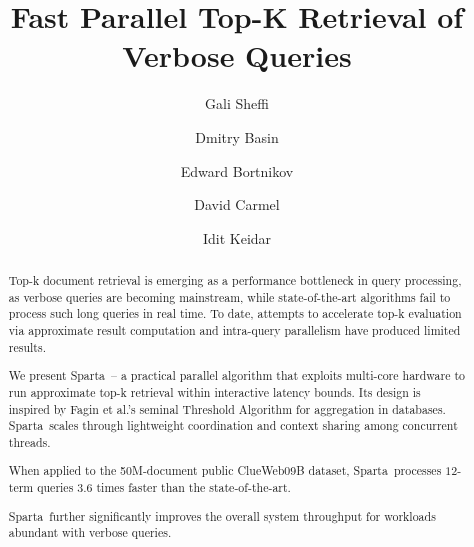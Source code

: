\documentclass[sigconf,review,anonymous]{acmart}
\title{Fast Parallel Top-K Retrieval of Verbose Queries}
\author{Gali Sheffi}%
\author{Dmitry Basin}%
\author{Edward Bortnikov}%
\author{David Carmel}%
\author{Idit Keidar}%
\newcommand{\alg}{Sparta}
\newcommand{\bigdataset}[1]{} %
\begin{document}
\begin{abstract}
Top-k document retrieval is emerging as a performance bottleneck in query processing, as verbose queries are becoming 
mainstream, while state-of-the-art algorithms fail to process such long queries in real time. To date, attempts to
accelerate top-k evaluation via approximate result computation and intra-query parallelism have produced limited results. 

We present \alg\ -- a practical parallel algorithm that exploits multi-core hardware to run approximate top-k retrieval 
within interactive latency bounds. Its design is inspired by  Fagin et al.'s seminal Threshold Algorithm for  aggregation in databases. 
\alg\ scales through lightweight coordination and context sharing among concurrent threads. 
\bigdataset{ 
both in the number of query terms and in the searched index size. 
}
When applied to the 50M-document public ClueWeb09B 
dataset, \alg\  processes $12$-term queries $3.6$ times faster than the state-of-the-art. 
\bigdataset{
On a tenfold  bigger index, 
\alg\ continues to process queries at the same speed, whereas today's best-in-class algorithm is more than 60 times slower. 
}
\alg\ further significantly improves the overall system throughput for workloads abundant with verbose queries.  
\end{abstract}


\maketitle








\clearpage

  
\end{document}
